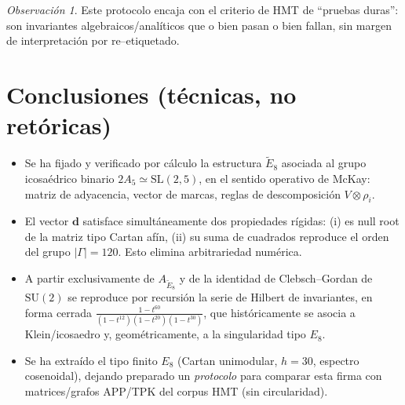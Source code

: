\documentclass[11pt,a4paper]{article}
\theoremstyle{definition}
\theoremstyle{remark}
\newtheorem{remark}{Observación}
\begin{document}
\begin{remark}
Este protocolo encaja con el criterio de HMT de ``pruebas duras'': son invariantes algebraicos/analíticos que o bien pasan
o bien fallan, sin margen de interpretación por re--etiquetado.
\end{remark}

\section{Conclusiones (técnicas, no retóricas)}
\begin{itemize}
\item Se ha fijado y verificado por cálculo la estructura $\widetilde{E}_8$ asociada al grupo icosaédrico binario $2A_5\simeq \mathrm{SL}(2,5)$,
en el sentido operativo de McKay: matriz de adyacencia, vector de marcas, reglas de descomposición $V\otimes\rho_i$.
\item El vector $\bm d$ satisface simultáneamente dos propiedades rígidas: (i) es null root de la matriz tipo Cartan afín, (ii) su suma de cuadrados
reproduce el orden del grupo $|\Gamma|=120$. Esto elimina arbitrariedad numérica.
\item A partir exclusivamente de $A_{\widetilde{E}_8}$ y de la identidad de Clebsch--Gordan de $\mathrm{SU}(2)$ se reproduce por recursión
la serie de Hilbert de invariantes, en forma cerrada $\frac{1-t^{60}}{(1-t^{12})(1-t^{20})(1-t^{30})}$,
que históricamente se asocia a Klein/icosaedro y, geométricamente, a la singularidad tipo $E_8$.
\item Se ha extraído el tipo finito $E_8$ (Cartan unimodular, $h=30$, espectro cosenoidal), dejando preparado un \emph{protocolo}
para comparar esta firma con matrices/grafos APP/TPK del corpus HMT (sin circularidad).
\end{itemize}
\end{document}
